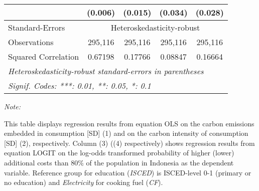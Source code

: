 \begin{table}[htbp!]
\begin{adjustbox}{width = 1\textwidth, max height = 0.95\textheight, center}
\begin{threeparttable}[b]
\begin{tabular}{lcccc}
                                 & (0.006)            & (0.015)            & (0.034)        & (0.028)\\   
            \midrule 
            Standard-Errors & \multicolumn{4}{c}{Heteroskedasticity-robust} \\ 
            Observations         & 295,116            & 295,116            & 295,116        & 295,116\\  
            Squared Correlation  & 0.67198            & 0.17766            & 0.08847        & 0.16664\\  
            \midrule \midrule
            \multicolumn{5}{l}{\emph{Heteroskedasticity-robust standard-errors in parentheses}}\\
            \multicolumn{5}{l}{\emph{Signif. Codes: ***: 0.01, **: 0.05, *: 0.1}}\\
         \end{tabular}
         
         \begin{tablenotes}\item \medskip \textit{Note:}
            \item This table displays regression results from equation OLS on the carbon emissions embedded in consumption [SD] (1) and on the carbon intensity of consumption [SD] (2), respectively. 
                                      Column (3) ((4) respectively) shows regression results from equation LOGIT on the log-odds transformed probability of higher (lower) additional costs than 80\% of the population in Indonesia as the dependent variable. Reference group for education (\textit{ISCED}) is ISCED-level 0-1 (primary or no education) and \textit{Electricity} for cooking fuel (\textit{CF}).
         \end{tablenotes}
      \end{threeparttable}
   \end{adjustbox}
\end{table}


